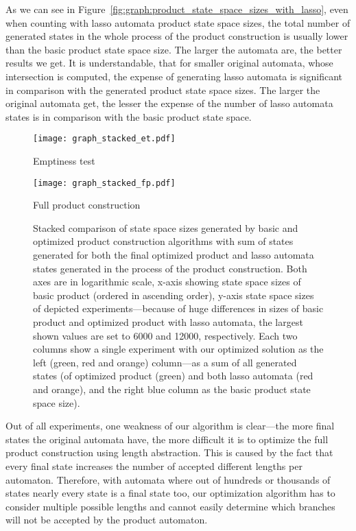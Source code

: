 As we can see in Figure~\ref{fig:graph:product_state_space_sizes_with_lasso}, even when counting with lasso automata product state space sizes, the total number of generated states in the whole process of the product construction is usually lower than the basic product state space size. The larger the automata are, the better results we get. It is understandable, that for smaller original automata, whose intersection is computed, the expense of generating lasso automata is significant in comparison with the generated product state space sizes. The larger the original automata get, the lesser the expense of the number of lasso automata states is in comparison with the basic product state space.

\begin{figure*}[ht]
    \centering
    \begin{minipage}{0.49\linewidth}
        \centering
        \texttt{[image: graph\_stacked\_et.pdf]}
        \caption{Emptiness test}
        \label{fig:graph:stacked_et_state_space_sizes_comp_with_lasso}
    \end{minipage}
    \hfill
    \begin{minipage}{0.49\linewidth}
        \centering
        \texttt{[image: graph\_stacked\_fp.pdf]}
        \caption{Full product construction}
        \label{fig:graph:stacked_fp_state_space_sizes_comp_with_lasso}
    \end{minipage}
    \vspace{0.5cm}
    \caption{Stacked comparison of state space sizes generated by basic and optimized product construction algorithms with sum of states generated for both the final optimized product and lasso automata states generated in the process of the product construction. Both axes are in logarithmic scale, x-axis showing state space sizes of basic product (ordered in ascending order), y-axis state space sizes of depicted experiments---because of huge differences in sizes of basic product and optimized product with lasso automata, the largest shown values are set to 6000 and 12000, respectively. Each two columns show a single experiment with our optimized solution as the left (green, red and orange) column---as a sum of all generated states (of optimized product (green) and both lasso automata (red and orange), and the right blue column as the basic product state space size).}
    \label{fig:graph:stacked_product_state_space_sizes_with_lasso}
\end{figure*}

Out of all experiments, one weakness of our algorithm is clear---the more final states the original automata have, the more difficult it is to optimize the full product construction using length abstraction. This is caused by the fact that every final state increases the number of accepted different lengths per automaton. Therefore, with automata where out of hundreds or thousands of states nearly every state is a final state too, our optimization algorithm has to consider multiple possible lengths and cannot easily determine which branches will not be accepted by the product automaton.


